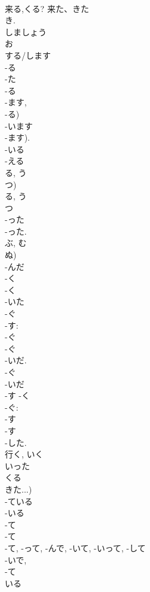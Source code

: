 \documentclass[8pt]{extreport}
\begin{document}
\begin{CJK}{UTF8}{min}
\\	来る,くる?	来た、きた	
\\	き.	
\\	しましょう		
\\	お 
\\	する/します 
\\	-る 
\\	-た		
\\	-る 
\\	-ます, 
\\	-る) 
\\	-います 
\\	-ます).	
\\	-いる 
\\	-える 
\\	る, う 
\\	つ) 
\\	る, う 
\\	つ 
\\	-った		
\\	-った.
\\	ぶ, む 
\\	ぬ) 
\\	-んだ		
\\	-く 
\\	-く 
\\	-いた		
\\	-ぐ 
\\	-す: 
\\	-ぐ 
\\	-ぐ 
\\	-いだ.		
\\	-ぐ 
\\	-いだ 
\\	-す -く 
\\	-ぐ: 
\\	-す 
\\	-す
\\	-した.		
\\	行く, いく 
\\	いった	
\\	くる 
\\	きた...)
\\	-ている 
\\	-いる 
\\	-て 
\\	-て 
\\	-て, -って, -んで, -いて, -いって, -して 
\\	-いで, 
\\	-て 
\\	いる 

\end{CJK}
\end{document}
